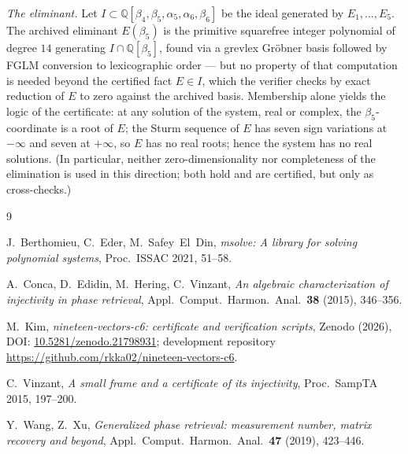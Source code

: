 \documentclass[10pt]{amsart}
\begin{document}
\emph{The eliminant.} Let
$I\subset\mathbb Q[\beta_4,\beta_5,\alpha_5,\alpha_6,\beta_6]$ be the
ideal generated by $E_1,\dots,E_5$. The archived eliminant
$E(\beta_5)$ is the primitive squarefree integer polynomial of degree
$14$ generating $I\cap\mathbb Q[\beta_5]$, found via a grevlex
Gr\"obner basis followed by FGLM conversion to lexicographic order ---
but no property of that computation is needed beyond the certified
fact $E\in I$, which the verifier checks by exact reduction of $E$ to
zero against the archived basis. Membership alone yields the logic of
the certificate: at any solution of the system, real or complex, the
$\beta_5$-coordinate is a root of $E$; the Sturm sequence of $E$ has
seven sign variations at $-\infty$ and seven at $+\infty$, so $E$ has
no real roots; hence the system has no real solutions. (In
particular, neither zero-dimensionality nor completeness of the
elimination is used in this direction; both hold and are certified,
but only as cross-checks.)

\begin{thebibliography}{9}

J.~Berthomieu, C.~Eder, M.~Safey~El~Din,
\emph{msolve: A library for solving polynomial systems},
Proc.\ ISSAC 2021, 51--58.

A.~Conca, D.~Edidin, M.~Hering, C.~Vinzant,
\emph{An algebraic characterization of injectivity in phase retrieval},
Appl.\ Comput.\ Harmon.\ Anal.\ \textbf{38} (2015), 346--356.

M.~Kim,
\emph{nineteen-vectors-c6: certificate and verification scripts},
Zenodo (2026), DOI: \href{https://doi.org/10.5281/zenodo.21798931}
{10.5281/zenodo.21798931}; development repository
\url{https://github.com/rkka02/nineteen-vectors-c6}.

C.~Vinzant,
\emph{A small frame and a certificate of its injectivity},
Proc.\ SampTA 2015, 197--200.

Y.~Wang, Z.~Xu,
\emph{Generalized phase retrieval: measurement number, matrix recovery
and beyond}, Appl.\ Comput.\ Harmon.\ Anal.\ \textbf{47} (2019),
423--446.

\end{thebibliography}
\end{document}
